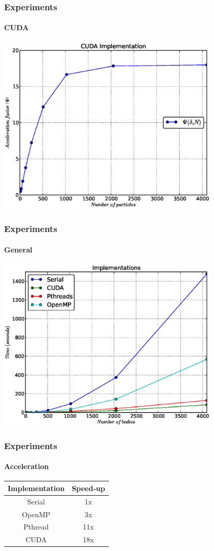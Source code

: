 \frame
{
\frametitle{Experiments}
\framesubtitle{CUDA}
\begin{center}
    \includegraphics[width=0.8\textwidth]{img/cuda}
\end{center}
}

\frame
{
\frametitle{Experiments}
\framesubtitle{General}
\begin{center}
    \includegraphics[width=0.8\textwidth]{img/all}
\end{center}
}

\frame
{
\frametitle{Experiments}
\framesubtitle{Acceleration}
\begin{center}
    \begin{tabular}{|c|c|}
        \hline
        \textbf{Implementation} & \textbf{Speed-up} \\\hline
        Serial  & 1x  \\\hline
        OpenMP  & 3x  \\\hline
        Pthread & 11x \\\hline
        CUDA    & 18x \\\hline
    \end{tabular}
\end{center}
}

